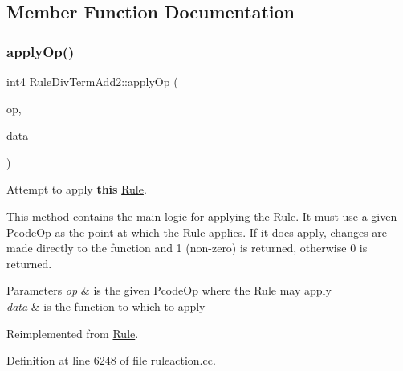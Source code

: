 \subsection{Member Function Documentation}
\mbox{\label{class_rule_div_term_add2_abc720625170593b9f1bd43748c2be78c}} 
\subsubsection{\texorpdfstring{applyOp()}{applyOp()}}
{\footnotesize\ttfamily int4 Rule\+Div\+Term\+Add2\+::apply\+Op (\begin{DoxyParamCaption}\item[{\mbox{\hyperlink{class_pcode_op}{Pcode\+Op}} $\ast$}]{op,  }\item[{\mbox{\hyperlink{class_funcdata}{Funcdata}} \&}]{data }\end{DoxyParamCaption})\hspace{0.3cm}{\ttfamily [virtual]}}



Attempt to apply {\bfseries{this}} \mbox{\hyperlink{class_rule}{Rule}}. 

This method contains the main logic for applying the \mbox{\hyperlink{class_rule}{Rule}}. It must use a given \mbox{\hyperlink{class_pcode_op}{Pcode\+Op}} as the point at which the \mbox{\hyperlink{class_rule}{Rule}} applies. If it does apply, changes are made directly to the function and 1 (non-\/zero) is returned, otherwise 0 is returned. 
\begin{DoxyParams}{Parameters}
{\em op} & is the given \mbox{\hyperlink{class_pcode_op}{Pcode\+Op}} where the \mbox{\hyperlink{class_rule}{Rule}} may apply \\
\hline
{\em data} & is the function to which to apply \\
\hline
\end{DoxyParams}


Reimplemented from \mbox{\hyperlink{class_rule_a4e3e61f066670175009f60fb9dc60848}{Rule}}.



Definition at line 6248 of file ruleaction.\+cc.

